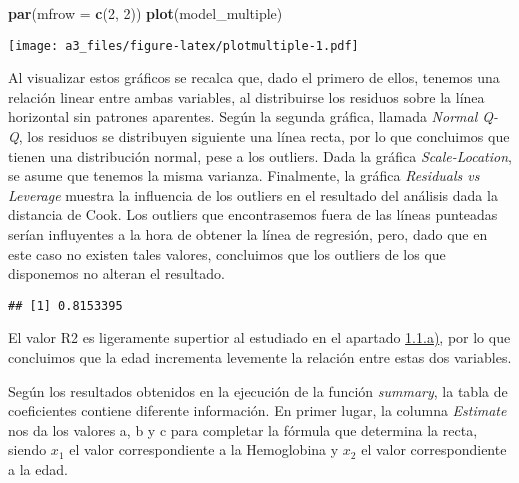 \documentclass[]{article}
\newenvironment{Shaded}{\begin{snugshade}}{\end{snugshade}}
\newcommand{\DataTypeTok}[1]{\textcolor[rgb]{0.13,0.29,0.53}{#1}}
\newcommand{\DecValTok}[1]{\textcolor[rgb]{0.00,0.00,0.81}{#1}}
\newcommand{\KeywordTok}[1]{\textcolor[rgb]{0.13,0.29,0.53}{\textbf{#1}}}
\newcommand{\NormalTok}[1]{#1}
\newcommand{\OperatorTok}[1]{\textcolor[rgb]{0.81,0.36,0.00}{\textbf{#1}}}
\newcommand{\StringTok}[1]{\textcolor[rgb]{0.31,0.60,0.02}{#1}}
\begin{document}
\begin{Shaded}
\begin{Highlighting}[]
\KeywordTok{par}\NormalTok{(}\DataTypeTok{mfrow =} \KeywordTok{c}\NormalTok{(}\DecValTok{2}\NormalTok{, }\DecValTok{2}\NormalTok{))}
\KeywordTok{plot}\NormalTok{(model_multiple)}
\end{Highlighting}
\end{Shaded}

\texttt{[image: a3\_files/figure-latex/plotmultiple-1.pdf]}

Al visualizar estos gráficos se recalca que, dado el primero de ellos,
tenemos una relación linear entre ambas variables, al distribuirse los
residuos sobre la línea horizontal sin patrones aparentes. Según la
segunda gráfica, llamada \emph{Normal Q-Q}, los residuos se distribuyen
siguiente una línea recta, por lo que concluimos que tienen una
distribución normal, pese a los outliers. Dada la gráfica
\emph{Scale-Location}, se asume que tenemos la misma varianza.
Finalmente, la gráfica \emph{Residuals vs Leverage} muestra la
influencia de los outliers en el resultado del análisis dada la
distancia de Cook. Los outliers que encontrasemos fuera de las líneas
punteadas serían influyentes a la hora de obtener la línea de regresión,
pero, dado que en este caso no existen tales valores, concluimos que los
outliers de los que disponemos no alteran el resultado.

\begin{Shaded}
\end{Shaded}

\begin{verbatim}
## [1] 0.8153395
\end{verbatim}

El valor R2 es ligeramente supertior al estudiado en el apartado
\protect\hyperlink{11a}{1.1.a)}, por lo que concluimos que la edad
incrementa levemente la relación entre estas dos variables.

Según los resultados obtenidos en la ejecución de la función
\emph{summary}, la tabla de coeficientes contiene diferente información.
En primer lugar, la columna \emph{Estimate} nos da los valores a, b y c
para completar la fórmula que determina la recta, siendo \(x_1\) el
valor correspondiente a la Hemoglobina y \(x_2\) el valor
correspondiente a la edad.
\end{document}
